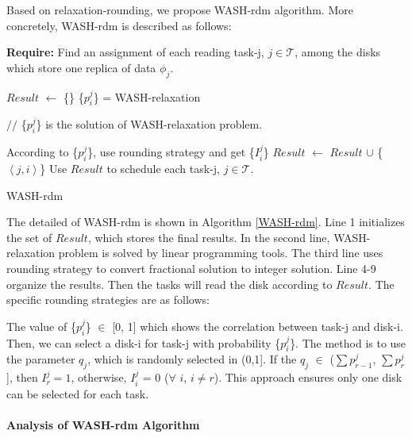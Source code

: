 \documentclass[conference]{IEEEtran}
\begin{document}
 Based on relaxation-rounding, we propose WASH-rdm algorithm. More concretely, WASH-rdm is described as follows: 

  \begin{algorithm}
 	\textbf{Require:} Find an assignment of each reading task-j, $j \in \mathcal{T}$, among the disks which store one replica of data $\phi_j$. %
 	\begin{algorithmic}[1]	
 		\State $Result$ $\gets$ \{\}
 		\State \{$p_i^j$\} = WASH-relaxation		
 		
 		$//$ \{$p_i^j$\} is the solution of WASH-relaxation problem. 
 		
 		\State According to \{$p_i^j$\}, use rounding strategy and get \{$I_i^j$\}
 			\State $Result$ $\gets$ $Result$ $\cup$ 	
 			\{$\left \langle j, i\right \rangle$\}
 			\EndIf
 		\EndFor	
 		\State Use $Result$ to schedule each task-j, $j \in \mathcal{T}$.
 	\end{algorithmic}
 	\caption{WASH-rdm}\label{WASH-rdm}
 \end{algorithm}

 The detailed of WASH-rdm is shown in Algorithm \ref{WASH-rdm}. Line 1 initializes the set of $Result$, which stores the final results. In the second line, WASH-relaxation problem is solved by linear programming tools. The third line uses rounding strategy to convert fractional solution to integer solution. Line 4-9 organize the results. Then the tasks will read the disk according to $Result$. The specific rounding strategies are as follows:
 
 The value of \{$p_i^j$\}  $\in$ [0, 1] which shows the correlation between task-j and disk-i. Then, we can select a disk-i for task-j with probability \{$p_i^j$\}. The method is to use the parameter $q_j$, which is randomly selected in (0,1]. If the $q_j$ $\in$ ($\sum p_{r-1}^{j}$, $\sum p_{r}^{j}$], then $I_r^j = 1$, otherwise, $I_i^j$ = 0 ($\forall$ $i$, $i \ne r$). This approach ensures only one disk can be selected for each task.%


\paragraph{\textbf{Analysis of WASH-rdm Algorithm}}
\end{document}
